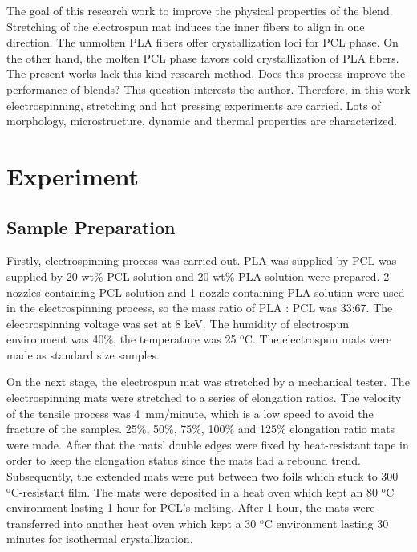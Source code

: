 \documentclass{article}%
\begin{document}
  The goal of this research work to improve the physical properties of the blend. 
  Stretching of the electrospun mat induces the inner fibers to align in one direction. 
  The unmolten PLA fibers offer crystallization loci for PCL phase.
  On the other hand, the molten PCL phase favors cold crystallization of PLA fibers.
  The present works lack this kind research method.
  Does this process improve the performance of blends? This question interests the author.
  Therefore, in this work electrospinning, stretching and hot pressing experiments are carried.
  Lots of morphology, microstructure, dynamic and thermal properties are characterized.
\label{sec:introduction}
  
\section{Experiment}
  \subsection{Sample Preparation} %
   \label{sub:sample_preparation}
   Firstly, electrospinning process was carried out.
   PLA was supplied by %
   PCL was supplied by %
   20 wt\% PCL solution and 20 wt\% PLA solution were prepared. 
   2 nozzles containing PCL solution and 1 nozzle containing PLA solution were used in the electrospinning process, 
   so the mass ratio of PLA : PCL was  33:67.
   The electrospinning voltage was set at 8 keV.
   The humidity of electrospun environment was 40\%, the temperature was 25 $\mathrm{^o C}$. %
   The electrospun mats were made as standard size samples.


   On the next stage, the electrospun mat was stretched by a mechanical tester. 
   The electrospinning mats were stretched to a series of elongation ratios. 
   The velocity of the tensile process was 4 mm/minute, which is a low speed to avoid the fracture of the samples.
   25\%, 50\%, 75\%, 100\% and 125\% elongation ratio mats were made.
   After that the mats' double edges were fixed by heat-resistant tape in order to keep the elongation status since the mats had a rebound trend.
   Subsequently, the extended mats were put between two foils which stuck to 300 $\mathrm{^o C}$-resistant film. 
   The mats were deposited in a heat oven which kept an 80 $\mathrm{^o C}$ environment lasting 1 hour for PCL's melting.
   After 1 hour, the mats were transferred into another heat oven which kept a 30 $\mathrm{^o C}$ environment lasting 30 minutes for isothermal crystallization.
\end{document}
